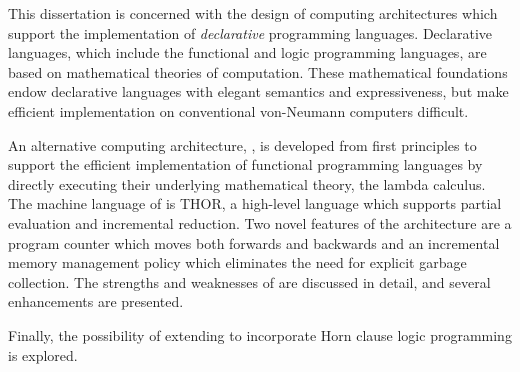 \clearpage
\thispagestyle{empty}

\vspace*{0.8in}

This dissertation is concerned with the design of computing architectures which
support the implementation of \emph{declarative} programming languages.
Declarative languages, which include the functional and logic programming
languages, are based on mathematical theories of computation. These mathematical
foundations endow declarative languages with elegant semantics and
expressiveness, but make efficient implementation on conventional von-Neumann
computers difficult.

An alternative computing architecture, , is developed from first
principles to support the efficient implementation of functional programming
languages by directly executing their underlying mathematical theory, the
lambda calculus. The machine language of  is THOR, a high-level language
which supports partial evaluation and incremental reduction. Two novel features
of the  architecture are a program counter which moves both forwards and
backwards and an incremental memory management policy which eliminates the need
for explicit garbage collection. The strengths and weaknesses of  are
discussed in detail, and several enhancements are presented.

Finally, the possibility of extending  to incorporate Horn clause logic
programming is explored.
